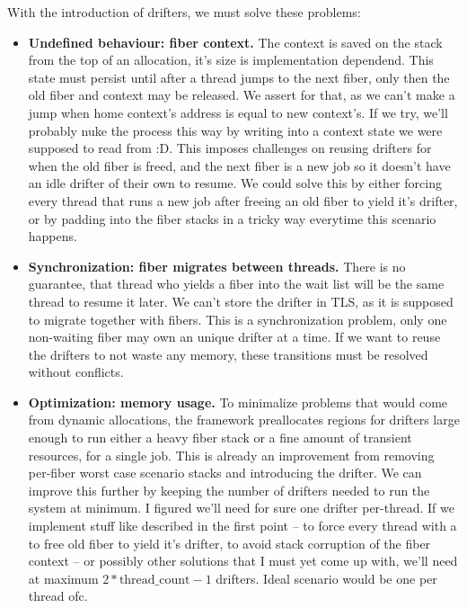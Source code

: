 With the introduction of drifters, we must solve these problems:
\begin{itemize}
    \item \textbf{Undefined behaviour: fiber context.} 
        The context is saved on the stack from the top of an allocation, it's size is implementation dependend.
        This state must persist until after a thread jumps to the next fiber, only then the old fiber and context may be released.
        We assert for that, as we can't make a jump when home context's address is equal to new context's.
        If we try, we'll probably nuke the process this way by writing into a context state we were supposed to read from :D.
        This imposes challenges on reusing drifters for when the old fiber is freed, 
        and the next fiber is a new job so it doesn't have an idle drifter of their own to resume.
        We could solve this by either forcing every thread that runs a new job after freeing an old fiber to yield it's drifter,
        or by padding into the fiber stacks in a tricky way everytime this scenario happens.
    \item \textbf{Synchronization: fiber migrates between threads.}
        There is no guarantee, that thread who yields a fiber into the wait list will be the same thread to resume it later.
        We can't store the drifter in TLS, as it is supposed to migrate together with fibers.
        This is a synchronization problem, only one non-waiting fiber may own an unique drifter at a time.
        If we want to reuse the drifters to not waste any memory, these transitions must be resolved without conflicts.
    \item \textbf{Optimization: memory usage.}
        To minimalize problems that would come from dynamic allocations, the framework preallocates regions for drifters 
        large enough to run either a heavy fiber stack or a fine amount of transient resources, for a single job.
        This is already an improvement from removing per-fiber worst case scenario stacks and introducing the drifter.
        We can improve this further by keeping the number of drifters needed to run the system at minimum.
        I figured we'll need for sure one drifter per-thread. 
        If we implement stuff like described in the first point -- 
        to force every thread with a to free old fiber to yield it's drifter, to avoid stack corruption of the fiber context -- 
        or possibly other solutions that I must yet come up with, we'll need at maximum $2*\text{thread\_count}-1$ drifters.
        Ideal scenario would be one per thread ofc.
\end{itemize}

